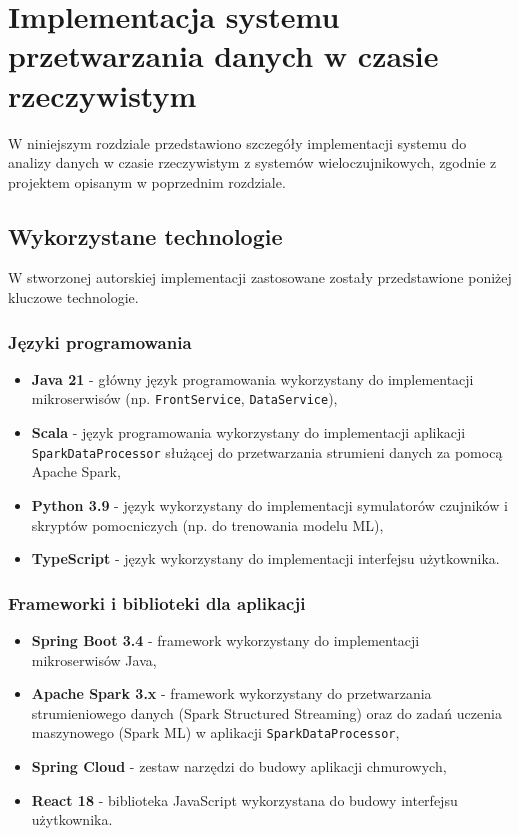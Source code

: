 \section{Implementacja systemu przetwarzania danych w czasie rzeczywistym}
\label{sec:implementacja_systemu}

W niniejszym rozdziale przedstawiono szczegóły implementacji systemu do analizy danych w czasie rzeczywistym z systemów wieloczujnikowych,
zgodnie z projektem opisanym w poprzednim rozdziale.

\subsection{Wykorzystane technologie}
\label{subsec:technologie}

W stworzonej autorskiej implementacji zastosowane zostały przedstawione poniżej kluczowe technologie.

\subsubsection{Języki programowania}
\label{subsubsec:jezyki_programowania}

\begin{itemize}
    \item \textbf{Java 21} - główny język programowania wykorzystany do implementacji mikroserwisów (np. \texttt{FrontService}, \texttt{DataService}),
    \item \textbf{Scala} - język programowania wykorzystany do implementacji aplikacji \texttt{SparkDataProcessor} służącej do przetwarzania strumieni danych za pomocą Apache Spark,
    \item \textbf{Python 3.9} - język wykorzystany do implementacji symulatorów czujników i skryptów pomocniczych (np. do trenowania modelu ML),
    \item \textbf{TypeScript} - język wykorzystany do implementacji interfejsu użytkownika.
\end{itemize}

\subsubsection{Frameworki i biblioteki dla aplikacji}
\label{subsubsec:frameworki}

\begin{itemize}
    \item \textbf{Spring Boot 3.4} - framework wykorzystany do implementacji mikroserwisów Java,
    \item \textbf{Apache Spark 3.x} \cite{spark_streaming} - framework wykorzystany do przetwarzania strumieniowego danych (Spark Structured Streaming) oraz do zadań uczenia maszynowego (Spark ML) w aplikacji \texttt{SparkDataProcessor},
    \item \textbf{Spring Cloud} - zestaw narzędzi do budowy aplikacji chmurowych,
    \item \textbf{React 18} - biblioteka JavaScript wykorzystana do budowy interfejsu użytkownika.
\end{itemize}


